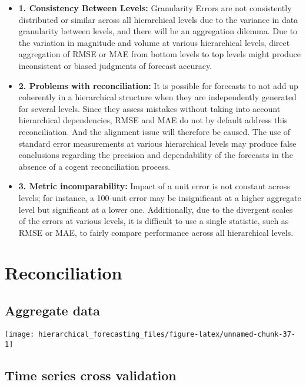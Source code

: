 \documentclass[
]{article}
\begin{document}
\begin{itemize}
\item
  \textbf{1. Consistency Between Levels:}
  Granularity Errors are not consistently distributed or similar across all hierarchical levels due to the variance in data granularity between levels, and there will be an aggregation dilemma. Due to the variation in magnitude and volume at various hierarchical levels, direct aggregation of RMSE or MAE from bottom levels to top levels might produce inconsistent or biased judgments of forecast accuracy.
\item
  \textbf{2. Problems with reconciliation:}
  It is possible for forecasts to not add up coherently in a hierarchical structure when they are independently generated for several levels. Since they assess mistakes without taking into account hierarchical dependencies, RMSE and MAE do not by default address this reconciliation. And the alignment issue will therefore be caused. The use of standard error measurements at various hierarchical levels may produce false conclusions regarding the precision and dependability of the forecasts in the absence of a cogent reconciliation process.
\item
  \textbf{3. Metric incomparability:}
  Impact of a unit error is not constant across levels; for instance, a 100-unit error may be insignificant at a higher aggregate level but significant at a lower one. Additionally, due to the divergent scales of the errors at various levels, it is difficult to use a single statistic, such as RMSE or MAE, to fairly compare performance across all hierarchical levels.
\end{itemize}

\hypertarget{reconciliation}{%
\section{Reconciliation}\label{reconciliation}}

\hypertarget{aggregate-data}{%
\subsection{Aggregate data}\label{aggregate-data}}

\texttt{[image: hierarchical\_forecasting\_files/figure-latex/unnamed-chunk-37-1]}

\hypertarget{time-series-cross-validation}{%
\subsection{Time series cross validation}\label{time-series-cross-validation}}
\end{document}
